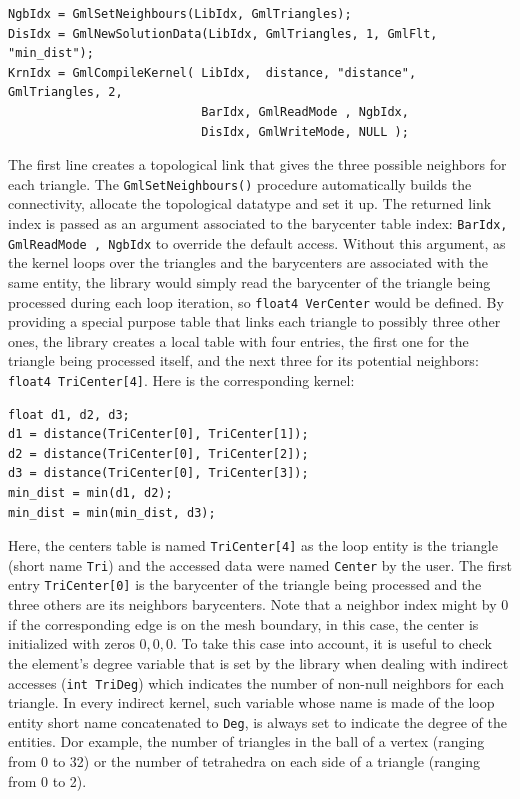 \documentclass[a4paper,12pt]{article}
\begin{document}
\begin{tt}
\begin{verbatim}
NgbIdx = GmlSetNeighbours(LibIdx, GmlTriangles);
DisIdx = GmlNewSolutionData(LibIdx, GmlTriangles, 1, GmlFlt, "min_dist");
KrnIdx = GmlCompileKernel( LibIdx,  distance, "distance", GmlTriangles, 2,
                           BarIdx, GmlReadMode , NgbIdx,
                           DisIdx, GmlWriteMode, NULL );
\end{verbatim}
\end{tt}
\normalfont

The first line creates a topological link that gives the three possible neighbors for each triangle. The {\tt GmlSetNeighbours()} procedure automatically builds the connectivity, allocate the topological datatype and set it up. The returned link index is passed as an argument associated to the barycenter table index: {\tt BarIdx, GmlReadMode , NgbIdx} to override the default access. Without this argument, as the kernel loops over the triangles and the barycenters are associated with the same entity, the library would simply read the barycenter of the triangle being processed during each loop iteration, so {\tt float4 VerCenter} would be defined. By providing a special purpose table that links each triangle to possibly three other ones, the library creates a local table with four entries, the first one for the triangle being processed itself, and the next three for its potential neighbors: {\tt float4 TriCenter[4]}. Here is the corresponding kernel:

\begin{tt}
\begin{verbatim}
float d1, d2, d3;
d1 = distance(TriCenter[0], TriCenter[1]);
d2 = distance(TriCenter[0], TriCenter[2]);
d3 = distance(TriCenter[0], TriCenter[3]);
min_dist = min(d1, d2);
min_dist = min(min_dist, d3);
\end{verbatim}
\end{tt}
\normalfont

Here, the centers table is named {\tt TriCenter[4]} as the loop entity is the triangle (short name {\tt Tri}) and the accessed data were named {\tt Center} by the user. The first entry {\tt TriCenter[0]} is the barycenter of the triangle being processed and the three others are its neighbors barycenters. Note that a neighbor index might by $0$ if the corresponding edge is on the mesh boundary, in this case, the center is initialized with zeros ${0,0,0}$. To take this case into account, it is useful to check the element's degree variable that is set by the library when dealing with indirect accesses ({\tt int TriDeg}) which indicates the number of non-null neighbors for each triangle. In every indirect kernel, such variable whose name is made of the loop entity short name concatenated to {\tt Deg}, is always set to indicate the degree of the entities. Dor example, the number of triangles in the ball of a vertex (ranging from 0 to 32) or the number of tetrahedra on each side of a triangle (ranging from 0 to 2).
\end{document}

